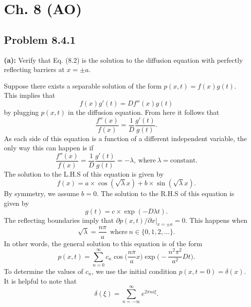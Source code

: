 \section{Ch. 8 (AO)}
\subsection{Problem 8.4.1}
\textbf{(a):} Verify that Eq. (8.2) is the solution to the diffusion equation with perfectly reflecting barriers at $x=\pm a$.

Suppose there exists a separable solution of the form $p(x,t) = f(x) g(t)$. This implies that
\begin{equation}
f(x) g'(t) = D f''(x) g(t)
\end{equation}
by plugging $p(x, t)$ in the diffusion equation. From here it follows that
\begin{equation}
\frac{f''(x)}{f(x)} = \frac{1}{D} \frac{g'(t)}{g(t)}.
\end{equation}
As each side of this equation is a function of a different independent variable, the only way this can happen is if 
\begin{equation}
\frac{f''(x)}{f(x)} = \frac{1}{D} \frac{g'(t)}{g(t)} = -\lambda,~\text{where}~\lambda=\text{constant}.
\end{equation}
The solution to the L.H.S of this equation is given by
\begin{equation}
f(x) = a \times \cos(\sqrt{\lambda} x) + b \times \sin(\sqrt{\lambda} x).
\end{equation}
By symmetry, we assume $b=0$. The solution to the R.H.S of this equation is given by
\begin{equation}
g(t) = c \times \exp(- D \lambda t).
\end{equation}
The reflecting boundaries imply that $\partial p(x,t)/\partial x |_{x=\pm a} = 0$.  This happens when
\begin{equation}
\sqrt{\lambda} = \frac{n \pi}{a}~~\text{where}~n \in \{0, 1, 2, \ldots\}.
\end{equation}
In other words, the general solution to this equation is of the form
\begin{equation}
p(x,t) = \sum_{n=0}^{\infty} c_n \cos\bigg(\frac{n \pi}{a} x \bigg) \exp\bigg(-\frac{n^2 \pi^2}{a^2} D t \bigg). \label{eq:gen_soln_refl_bound}
\end{equation}
To determine the values of $c_n$, we use the initial condition $p(x, t=0) = \delta(x)$. It is helpful to note that
\begin{equation}
\delta(\xi) = \sum_{n=-\infty}^{\infty} e^{2 \pi n i \xi}. \nonumber
\end{equation}
